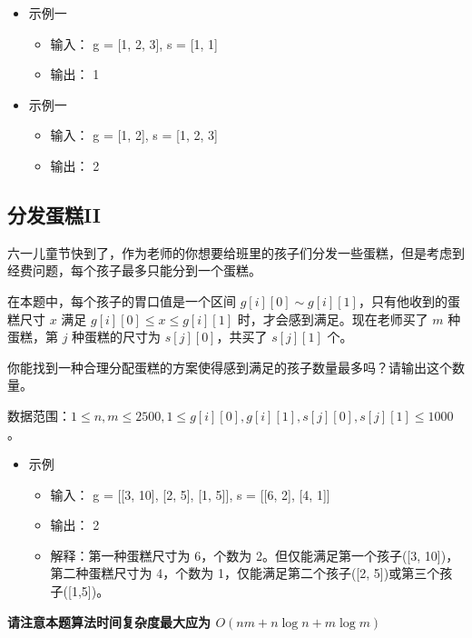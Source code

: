 \documentclass[12pt,a4paper]{article}
\begin{document}
\begin{itemize} [noitemsep]
    \item 示例一
          \begin{itemize}[noitemsep]
              \item[] 输入： g = [1, 2, 3], s = [1, 1]
              \item[] 输出： 1
          \end{itemize}
    \item 示例一
          \begin{itemize}[noitemsep]
              \item[] 输入： g = [1, 2], s = [1, 2, 3]
              \item[] 输出： 2
          \end{itemize}
\end{itemize}

\subsection{分发蛋糕II}

六一儿童节快到了，作为老师的你想要给班里的孩子们分发一些蛋糕，但是考虑到经费问题，每个孩子最多只能分到一个蛋糕。

在本题中，每个孩子的胃口值是一个区间 $g[i][0]\sim g[i][1]$，只有他收到的蛋糕尺寸 $x$ 满足 $g[i][0] \le x \le g[i][1]$ 时，才会感到满足。现在老师买了 $m$ 种蛋糕，第 $j$ 种蛋糕的尺寸为 $s[j][0]$，共买了 $s[j][1]$ 个。

你能找到一种合理分配蛋糕的方案使得感到满足的孩子数量最多吗？请输出这个数量。

数据范围：$1\le n, m \le 2500, 1\le g[i][0], g[i][1], s[j][0], s[j][1] \le 1000$。

\begin{itemize} [noitemsep]
    \item 示例
          \begin{itemize}[noitemsep]
              \item[] 输入： g = [[3, 10], [2, 5], [1, 5]], s = [[6, 2], [4, 1]]
              \item[] 输出： 2
              \item[] \small 解释：第一种蛋糕尺寸为 6，个数为 2。但仅能满足第一个孩子([3, 10])，第二种蛋糕尺寸为 4，个数为 1，仅能满足第二个孩子([2, 5])或第三个孩子([1,5])。
          \end{itemize}
\end{itemize}


\textbf{请注意本题算法时间复杂度最大应为 $O(nm + n\log n + m\log m)$}
\end{document}
